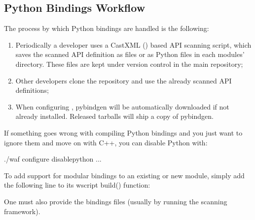 \documentclass[letterpaper,10pt,english]{sphinxmanual}
\renewcommand{\sphinxcode}[1]{\texttt{\small{#1}}}
\begin{document}
\subsection{Python Bindings Workflow}
\label{\detokenize{python:python-bindings-workflow}}
The process by which Python bindings are handled is the following:
\begin{enumerate}
%
\item {} 
Periodically a developer uses a CastXML () based API scanning script, which saves the scanned API definition as \sphinxcode{} files or as Python files in each modules’ \sphinxcode{} directory.  These files are kept under version control in the main  repository;

\item {} 
Other developers clone the repository and use the already scanned API definitions;

\item {} 
When configuring , pybindgen will be automatically downloaded if not already installed.  Released  tarballs will ship a copy of pybindgen.

\end{enumerate}

If something goes wrong with compiling Python bindings and you just want to ignore them and move on with C++, you can disable Python with:

\begin{sphinxVerbatim}[commandchars=\\\{\}]
\PYGZdl{} ./waf configure \PYGZhy{}\PYGZhy{}disable\PYGZhy{}python ...
\end{sphinxVerbatim}

To add support for modular bindings to an existing or new  module, simply add the following line to its wscript build() function:

\begin{sphinxVerbatim}[commandchars=\\\{\}]
\end{sphinxVerbatim}

One must also provide the bindings files (usually by running the scanning
framework).
\end{document}
